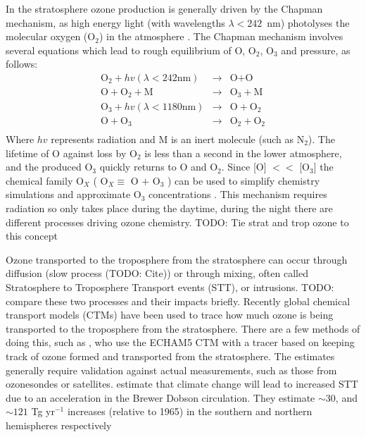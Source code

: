     In the stratosphere ozone production is generally driven by the Chapman mechanism, as high energy light (with wavelengths $\lambda<242$~nm) photolyses the molecular oxygen (O$_2$) in the atmosphere \citep[][Chapter 3, section 2]{BrasseurJacob2017}.
    The Chapman mechanism involves several equations which lead to rough equilibrium of O, O$_2$, O$_3$ and pressure, as follows:
    \begin{eqnarray*}
      \textrm{O}_2 + hv(\lambda < 242 \text{nm}) & \rightarrow & \text{O} + \text{O} \\
      \text{O} + \text{O}_2 + \text{M} & \rightarrow & \text{O}_3 + \text{M} \\
      \text{O}_3 + hv(\lambda < 1180 \text{nm}) & \rightarrow & \text{O} + \text{O}_2 \\
      \text{O} + \text{O}_3 & \rightarrow & \text{O}_2 + \text{O}_2 \\
    \end{eqnarray*}
    Where $hv$ represents radiation and M is an inert molecule (such as N$_2$).
    The lifetime of O against loss by O$_2$ is less than a second in the lower atmosphere, and the produced O$_3$ quickly returns to O and O$_2$.
    Since [O] $<<$ [O$_3$] the chemical family O$_X$ (  O$_X \equiv $ O $+$ O$_3$ ) can be used to simplify chemistry simulations and approximate O$_3$ concentrations \citep[][Chapter 3]{BrasseurJacob2017}.
    This mechanism requires radiation so only takes place during the daytime, during the night there are different processes driving ozone chemistry.
    TODO: Tie strat and trop ozone to this concept
    
    Ozone transported to the troposphere from the stratosphere can occur through diffusion (slow process (TODO: Cite)) or through mixing, often called Stratosphere to Troposphere Transport events (STT), or intrusions.
    TODO: compare these two processes and their impacts briefly.
    Recently global chemical transport models (CTMs) have been used to trace how much ozone is being transported to the troposphere from the stratosphere.
    There are a few methods of doing this, such as \citet{Ojha2016}, who use the ECHAM5 CTM with a tracer based on keeping track of ozone formed and transported from the stratosphere.
    The estimates generally require validation against actual measurements, such as those from ozonesondes or satellites.
    \citet{Hegglin2009} estimate that climate change will lead to increased STT due to an acceleration in the Brewer Dobson circulation.
    They estimate $\sim 30$, and $\sim 121$ Tg yr$^{-1}$ increases (relative to 1965) in the southern and northern hemispheres respectively
    

